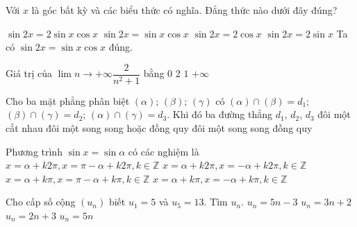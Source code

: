 \begin{ex}%
	Với $x$ là góc bất kỳ và các biểu thức có nghĩa. Đẳng thức nào dưới đây đúng?

	\choice
	{$\sin 2x = 2 \sin x \cos x$}
	{\True $\sin 2x = \sin x \cos x$}
	{$\sin 2x = 2 \cos x$}
	{$\sin 2x = 2 \sin x$}
	\loigiai
	{
		Ta có	$\sin 2x = \sin x \cos x$ đúng.
	}
\end{ex}

\begin{ex}%
	Giá trị của $\lim \limits{n \to +\infty}\dfrac{2}{n^2+1}$ bằng
	\choice
	{\True $0$}
	{$2$}
	{$1$}
	{$+\infty$}
\end{ex}

\begin{ex}%
	Cho ba mặt phẳng phân biệt $(\alpha);\,(\beta);\,(\gamma)$ có $(\alpha)\cap(\beta)=d_1$; $(\beta)\cap(\gamma)=d_2$; $(\alpha)\cap(\gamma)=d_3$. Khi đó ba đường thẳng $d_1$, ${d_2}$, ${d_3}$
	\choice
	{đôi một cắt nhau}
	{\True đôi một song song hoặc đồng quy}
	{đôi một song song}
	{đồng quy}
\end{ex}

\begin{ex}%
	Phương trình $\sin x=\sin\alpha $ có các nghiệm là
	\choice
	{\True $x=\alpha+k 2 \pi, x=\pi-\alpha+k 2 \pi, k \in \mathbb{Z}$}
	{$x=\alpha+k 2 \pi, x=-\alpha+k 2 \pi, k \in \mathbb{Z}$}
	{$x=\alpha+k \pi, x=\pi-\alpha+k \pi, k \in \mathbb{Z}$}
	{$x=\alpha+k \pi, x=-\alpha+k \pi, k \in \mathbb{Z}$}
\end{ex}


\begin{ex}%
	Cho cấp số cộng $(u_n)$ biết $u_1=5$ và $u_5=13$. Tìm $u_n$.
	\choice
	{$u_n=5n-3$}
	{$u_n=3n+2$}
	{\True $u_n=2n+3$}
	{$u_n=5n$}
\end{ex}

